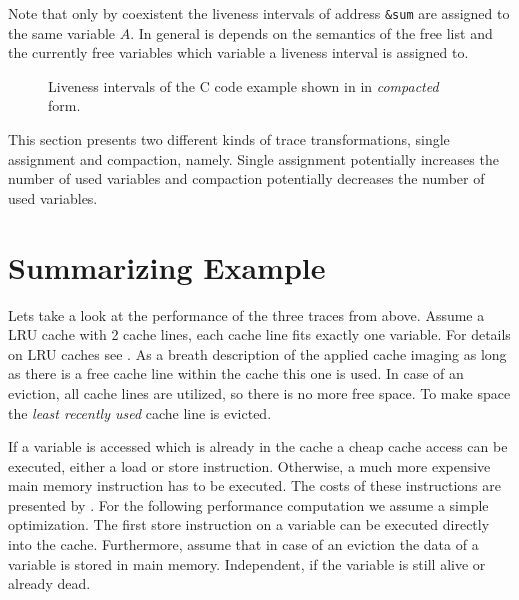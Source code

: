 \documentclass[onecolumn, openright, master, english, signatures]{dbrgrptt}
\begin{document}
\begin{remark}
Note that only by coexistent the liveness intervals of address \texttt{\&sum} are assigned to the same variable $A$. In general is depends on the semantics of the free list and the currently free variables which variable a liveness interval is assigned to.
\end{remark}

\begin{figure}[!ht]
  \centering
  
  \caption{Liveness intervals of the C code example shown in  in \emph{compacted} form.}
  \label{fig:trace-transformation-compact}
\end{figure}

This section presents two different kinds of \ac{trace} transformations, single assignment and compaction, namely. Single assignment potentially increases the number of used variables and compaction potentially decreases the number of used variables.


\section{Summarizing Example}

Lets take a look at the performance of the three \ac{trace}s from above. Assume a \ac{LRU} cache with 2 cache lines, each cache line fits exactly one variable. For details on \ac{LRU} caches see . As a breath description of the applied cache imaging as long as there is a free cache line within the cache this one is used. In case of an eviction, all cache lines are utilized, so there is no more free space. To make space the \emph{least recently used} cache line is evicted.

If a variable is accessed which is already in the cache a cheap cache access can be executed, either a load or store instruction. Otherwise, a much more expensive main memory instruction has to be executed. The costs of these instructions are presented by . For the following performance computation we assume a simple optimization. The first store instruction on a variable can be executed directly into the cache. Furthermore, assume that in case of an eviction the data of a variable is stored in main memory. Independent, if the variable is still alive or already dead.
\end{document}
